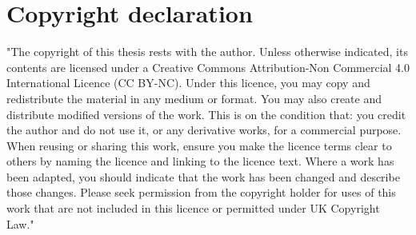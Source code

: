 \section*{Copyright declaration}

"The copyright of this thesis rests with the author. Unless otherwise indicated, its contents are licensed under a Creative Commons
Attribution-Non Commercial 4.0 International Licence (CC BY-NC). Under this licence, you may copy and redistribute the material in any
medium or format. You may also create and distribute modified versions of the work. This is on the condition that: you credit the
author and do not use it, or any derivative works, for a commercial purpose.
When reusing or sharing this work, ensure you make the licence terms clear to others by naming the licence and linking to the licence
text. Where a work has been adapted, you should indicate that the work has been changed and describe those changes.
Please seek permission from the copyright holder for uses of this work that are not included in this licence or permitted under UK
Copyright Law."